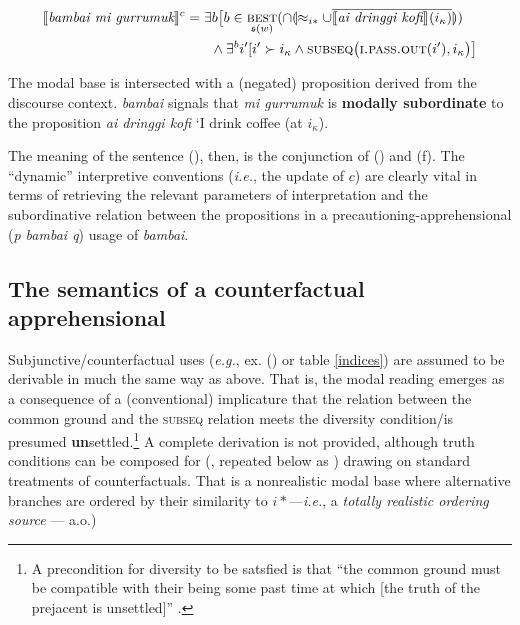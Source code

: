 $$\begin{multlined} \denote[c]{\textit{bambai mi gurrumuk}} = \exists b\big[b\in\underset{\mathfrak s(w)}{\textsc{best}}(\cap\llparenthesis\approx_{i*}\cup\overline{\denote{\textit{ai dringgi kofi}}(i_\kappa)}\rrparenthesis)\\\wedge \exists^bi'[i'\succ i_\kappa\wedge \textsc{subseq}\big(\textsc{i.pass.out}(i'),i_\kappa\big)\big]\end{multlined}$$


The modal base is intersected with a (negated) proposition derived from the discourse context. \textit{bambai} signals that \textit{mi gurrumuk} is \textbf{modally subordinate} to the proposition \textit{ai dringgi kofi} `I drink coffee (at $ i_\kappa $).
\xe

\noindent The meaning of the sentence (), then, is the conjunction of () and (f). The ``dynamic'' interpretive conventions (\textit{i.e.}, the update of $ c $) are clearly vital in terms of retrieving the relevant parameters of interpretation and the subordinative relation between the propositions in a precautioning-apprehensional (\textit{p bambai q}) usage of \textit{bambai}.

\subsection{The semantics of a counterfactual apprehensional}

Subjunctive/counterfactual uses (\textit{e.g.}, ex. () or table \ref{indices}) are assumed to be derivable in much the same way as above. That is, the modal reading emerges as a consequence of a (conventional) implicature that the relation between the common ground and the \textsc{subseq} relation meets the diversity condition/is presumed \textbf{un}settled.\footnote{A precondition for diversity to be satsfied is that ``the common ground must be compatible with their being some past time at which [the truth of the prejacent is unsettled]'' \citep[85]{Condoravdi2002}.} A complete derivation is not provided, although truth conditions can be composed for (, repeated below as ) drawing on standard treatments of counterfactuals. That is a nonrealistic modal base where alternative branches are ordered by their similarity to $ i* $---\textit{i.e.}, a \textit{totally realistic ordering source} --- \citealp[\textit{cf.}][]{Kratzer1981a,Kratzer2012,Lewis1973,Lewis1981} a.o.)

